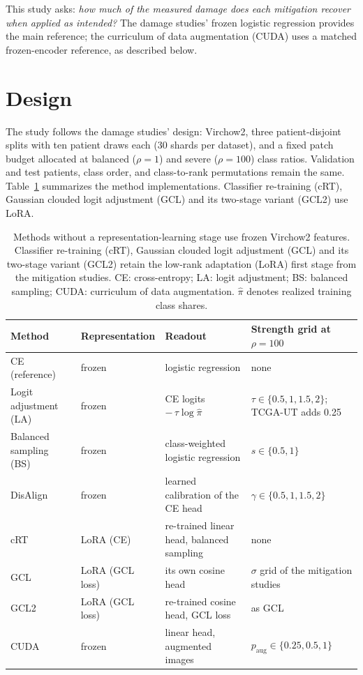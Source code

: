 \documentclass[11pt]{article}
\begin{document}
This study asks: \emph{how much of the measured damage does each mitigation recover when applied as intended?} The damage studies' frozen logistic regression provides the main reference; the curriculum of data augmentation (CUDA) uses a matched frozen-encoder reference, as described below.

\section{Design}
\label{sec:design}
The study follows the damage studies' design: Virchow2, three patient-disjoint splits with ten patient draws each (30 shards per dataset), and a fixed patch budget allocated at balanced ($\rho=1$) and severe ($\rho=100$) class ratios. Validation and test patients, class order, and class-to-rank permutations remain the same. Table~\ref{tab:assignment} summarizes the method implementations. Classifier re-training (cRT), Gaussian clouded logit adjustment (GCL) and its two-stage variant (GCL2) use LoRA.

\begin{table}[htbp]
\centering
\small
\renewcommand{\arraystretch}{1.15}
\begin{tabularx}{\textwidth}{@{}ll>{\raggedright\arraybackslash}X>{\raggedright\arraybackslash}X@{}}
\toprule
Method & Representation & Readout & Strength grid at $\rho=100$ \\
\midrule
CE (reference) & frozen & logistic regression & none \\
Logit adjustment (LA) & frozen & CE logits $-\,\tau\log\hat\pi$ & $\tau\in\{0.5,1,1.5,2\}$; TCGA-UT adds 0.25 \\
Balanced sampling (BS) & frozen & class-weighted logistic regression & $s\in\{0.5,1\}$ \\
DisAlign & frozen & learned calibration of the CE head & $\gamma\in\{0.5,1,1.5,2\}$ \\
cRT & LoRA (CE) & re-trained linear head, balanced sampling & none \\
GCL & LoRA (GCL loss) & its own cosine head & $\sigma$ grid of the mitigation studies \\
GCL2 & LoRA (GCL loss) & re-trained cosine head, GCL loss & as GCL \\
CUDA & frozen & linear head, augmented images & $p_{\mathrm{aug}}\in\{0.25,0.5,1\}$ \\
\bottomrule
\end{tabularx}
\caption{Methods without a representation-learning stage use frozen Virchow2 features. Classifier re-training (cRT), Gaussian clouded logit adjustment (GCL) and its two-stage variant (GCL2) \citep{kang2020decouplingRepresentation,li2022gaussianClouded} retain the low-rank adaptation (LoRA) first stage from the mitigation studies. CE: cross-entropy; LA: logit adjustment; BS: balanced sampling; CUDA: curriculum of data augmentation. $\hat\pi$ denotes realized training class shares.}
\label{tab:assignment}
\end{table}
\end{document}
